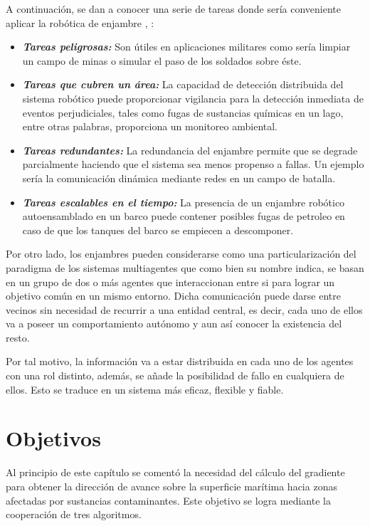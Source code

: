A continuación, se dan a conocer una serie de tareas donde sería conveniente aplicar la robótica de enjambre \cite{Aplicacion_3}, \cite{Aplicacion_4}:

\begin{itemize}
	\item \textbf{\emph{Tareas peligrosas:}} Son útiles en aplicaciones militares como sería limpiar un campo de minas o simular el paso de los soldados sobre éste.
	\item \textbf{\emph{Tareas que cubren un área:}} La capacidad de detección distribuida del sistema robótico puede proporcionar vigilancia para la detección inmediata de eventos perjudiciales, tales como fugas de sustancias químicas en un lago, entre otras palabras, proporciona un monitoreo ambiental.
	\item \textbf{\emph{Tareas redundantes:}} La redundancia del enjambre permite que se degrade parcialmente haciendo que el sistema sea menos propenso a fallas. Un ejemplo sería la comunicación dinámica mediante redes en un campo de batalla.
	\item \textbf{\emph{Tareas escalables en el tiempo:}} La presencia de un enjambre robótico autoensamblado en un barco puede contener posibles fugas de petroleo en caso de que los tanques del barco se empiecen a descomponer.
\end{itemize}

Por otro lado, los enjambres pueden considerarse como una particularización del paradigma de los sistemas multiagentes que como bien su nombre indica, se basan en un grupo de dos o más agentes que interaccionan entre si para lograr un objetivo común en un mismo entorno. Dicha comunicación puede darse entre vecinos sin necesidad de recurrir a una entidad central, es decir, cada uno de ellos va a poseer un comportamiento autónomo y aun así conocer la existencia del resto.

Por tal motivo, la información va a estar distribuida en cada uno de los agentes con una rol distinto, además, se añade la posibilidad de fallo en cualquiera de ellos. Esto se traduce en un sistema más eficaz, flexible y fiable. 

\section{Objetivos} \label{Objetivos_Principales}

Al principio de este capítulo se comentó la necesidad del cálculo del gradiente para obtener la dirección de avance sobre la superficie marítima hacia zonas afectadas por sustancias contaminantes. Este objetivo se logra mediante la cooperación de tres algoritmos.

